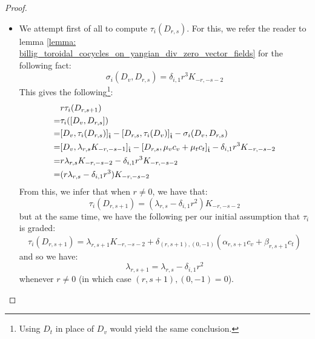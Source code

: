 \begin{proof}
                \begin{itemize}
                    \item We attempt first of all to compute $\tau_i(D_{r, s})$. For this, we refer the reader to lemma \ref{lemma: billig_toroidal_cocycles_on_yangian_div_zero_vector_fields} for the following fact:
                        $$\sigma_i(D_v, D_{r, s}) = \delta_{i, 1} r^3 K_{-r, -s - 2}$$
                    This gives the following\footnote{Using $D_t$ in place of $D_v$ would yield the same conclusion.}:
                        $$
                            \begin{aligned}
                                & r \tau_i(D_{r, s + 1})
                                \\
                                = & \tau_i([D_v, D_{r, s}])
                                \\
                                = & [D_v, \tau_i(D_{r, s})]_{\hat{\mathfrak{t}}} - [D_{r, s}, \tau_i(D_v)]_{\hat{\mathfrak{t}}} - \sigma_i(D_v, D_{r, s})
                                \\
                                = & [D_v, \lambda_{r, s} K_{-r, -s - 1}]_{\hat{\mathfrak{t}}} - [D_{r, s}, \mu_v c_v + \mu_t c_t]_{\hat{\mathfrak{t}}} - \delta_{i, 1} r^3 K_{-r, -s - 2}
                                \\
                                = & r \lambda_{r, s} K_{-r, -s - 2} - \delta_{i, 1} r^3 K_{-r, -s - 2}
                                \\
                                = & ( r \lambda_{r, s} - \delta_{i, 1} r^3 ) K_{-r, -s - 2}
                            \end{aligned}
                        $$
                    From this, we infer that when $r \not = 0$, we have that:
                        $$\tau_i(D_{r, s + 1}) = (\lambda_{r, s} - \delta_{i, 1} r^2) K_{-r, -s - 2}$$
                    but at the same time, we have the following per our initial assumption that $\tau_i$ is graded:
                        $$\tau_i(D_{r, s + 1}) = \lambda_{r, s + 1} K_{-r, -s - 2} + \delta_{(r, s + 1), (0, -1)} ( \alpha_{r, s + 1} c_v + \beta_{r, s + 1} c_t )$$
                    and so we have:
                        $$\lambda_{r, s + 1} = \lambda_{r, s} - \delta_{i, 1} r^2$$
                    whenever $r \not = 0$ (in which case ${(r, s + 1), (0, -1)} = 0$).
                    

\end{itemize}
\end{proof}
